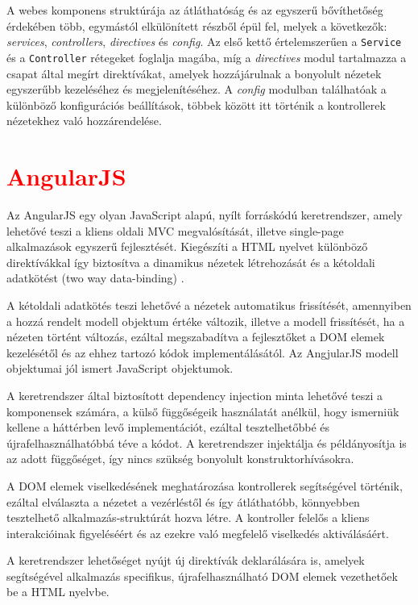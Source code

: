 A webes komponens struktúrája az átláthatóság és az egyszerű bővíthetőség érdekében több, egymástól elkülönített részből épül fel, melyek a következők: \textsl{services}, \textsl{controllers}, \textsl{directives} és \textsl{config}. Az első kettő értelemszerűen a \texttt{Service} és a \texttt{Controller} rétegeket foglalja magába, míg a \textsl{directives} modul tartalmazza a csapat által megírt direktívákat, amelyek hozzájárulnak a bonyolult nézetek egyszerűbb kezeléséhez és megjelenítéséhez. A \textsl{config} modulban találhatóak a különböző konfigurációs beállítások, többek között itt történik a kontrollerek nézetekhez való hozzárendelése. 

\section{\textcolor{red}{AngularJS}}
\label{sec:angularjs}
Az AngularJS egy olyan JavaScript alapú, nyílt forráskódú keretrendszer, amely lehetővé teszi a kliens oldali MVC megvalósítását, illetve single-page alkalmazások egyszerű fejlesztését. Kiegészíti a HTML nyelvet különböző direktívákkal így biztosítva a dinamikus nézetek létrehozását és a kétoldali adatkötést (two way data-binding) \cite{AngularJS}.

A kétoldali adatkötés teszi lehetővé a nézetek automatikus frissítését, amennyiben a hozzá rendelt modell objektum értéke változik, illetve a modell frissítését, ha a nézeten történt változás, ezáltal megszabadítva a fejlesztőket a DOM elemek kezelésétől és az ehhez tartozó kódok implementálásától. Az AngjularJS modell objektumai jól ismert JavaScript objektumok.

A keretrendszer által biztosított dependency injection minta lehetővé teszi a komponensek számára, a külső függőségeik használatát anélkül, hogy ismerniük kellene  a háttérben levő implementációt, ezáltal tesztelhetőbbé és újrafelhasználhatóbbá téve a kódot. A keretrendszer injektálja és példányosítja is az adott függőséget, így nincs szükség bonyolult konstruktorhívásokra.     

A DOM elemek viselkedésének meghatározása kontrollerek segítségével történik, ezáltal elválaszta a nézetet a vezérléstől és így átláthatóbb, könnyebben tesztelhető alkalmazás-struktúrát hozva létre. A kontroller felelős a kliens interakcióinak figyeléséért és az ezekre való megfelelő viselkedés aktiválásáért. 



A keretrendszer lehetőséget nyújt új direktívák deklarálására is, amelyek segítségével alkalmazás specifikus, újrafelhasználható DOM elemek vezethetőek be a HTML nyelvbe. 


